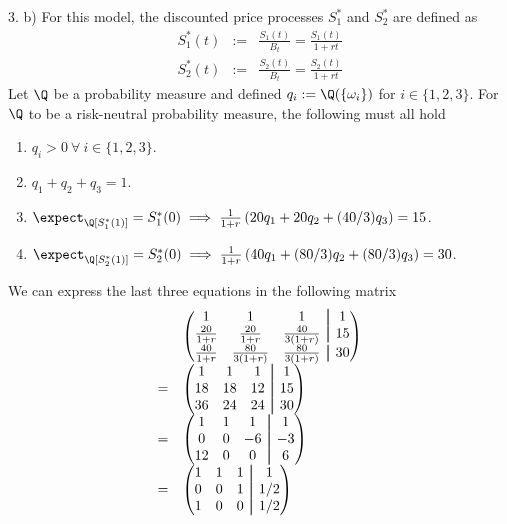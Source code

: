 \documentclass[11pt,a4paper]{article}
\newcommand\aug{\fboxsep=-\fboxrule\!\!\!\fbox{\strut}\!\!\!}
\begin{document}
\begin{answer}{3. b)}
  For this model, the discounted price processes $S_1^*$ and $S_2^*$ are defined as
  \[\begin{array}{rcl}
    S_1^*(t)&:=&\frac{S_1(t)}{B_t}=\frac{S_1(t)}{1+rt}\\
    S_2^*(t)&:=&\frac{S_2(t)}{B_t}=\frac{S_2(t)}{1+rt}
  \end{array}\]
  Let $\Q$ be a probability measure and defined $q_i:=\Q(\{\omega_i\})$ for $i\in\{1,2,3\}$. For $\Q$ to be a risk-neutral probability measure, the following must all hold
  \begin{enumerate}
    \item $q_i>0\ \forall\ i\in\{1,2,3\}$.
    \item $q_1+q_2+q_3=1$.
    \item $\expect_\Q[S_1^*(1)]=S_1^*(0)\implies\frac1{1+r}\left(20q_1+20q_2+(40/3)q_3\right)=15$.
    \item $\expect_\Q[S_2^*(1)]=S_2^*(0)\implies\frac1{1+r}\left(40q_1+(80/3)q_2+(80/3)q_3\right)=30$.
  \end{enumerate}
  We can express the last three equations in the following matrix %
  \[\begin{array}{rl}
    &\begin{pmatrix}
        1&1&1&\aug&1\\
        \frac{20}{1+r}&\frac{20}{1+r}&\frac{40}{3(1+r)}&\aug&15\\
        \frac{40}{1+r}&\frac{80}{3(1+r)}&\frac{80}{3(1+r)}&\aug&30\\
      \end{pmatrix}\\
    =&\begin{pmatrix}
        1&1&1&\aug&1\\
        18&18&12&\aug&15\\
        36&24&24&\aug&30\\
    \end{pmatrix}\\
    =&\begin{pmatrix}
        1&1&1&\aug&1\\
        0&0&-6&\aug&-3\\
        12&0&0&\aug&6
    \end{pmatrix}\\
    =&\begin{pmatrix}
        1&1&1&\aug&1\\
        0&0&1&\aug&1/2\\
        1&0&0&\aug&1/2
    \end{pmatrix}\\

\end{array}\]
\end{answer}
\end{document}
